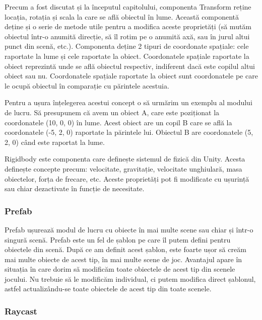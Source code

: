 \documentclass[12pt, a4paper]{article}
\begin{document}
	Precum a fost discutat și la începutul capitolului, componenta Transform reține locația, rotația și scala la care se află obiectul în lume. Această componentă deține și o serie de metode utile pentru a modifica aceste proprietăți (să mutăm obiectul într-o anumită direcție, să îl rotim pe o anumită axă, sau în jurul altui punct din scenă, etc.). Componenta deține 2 tipuri de coordonate spațiale: cele raportate la lume și cele raportate la obiect. Coordonatele spațiale raportate la obiect reprezintă unde se află obiectul respectiv, indiferent dacă este copilul altui obiect sau nu. Coordonatele spațiale raportate la obiect sunt coordonatele pe care le ocupă obiectul în comparație cu părintele acestuia.
	\newline
	
	Pentru a ușura înțelegerea acestui concept o să urmărim un exemplu al modului de lucru. Să presupunem că avem un obiect A, care este poziționat la coordonatele (10, 0, 0) în lume. Acest obiect are un copil B care se află la coordonatele (-5, 2, 0) raportate la părintele lui. Obiectul B are coordonatele (5, 2, 0) când este raportat la lume.
	\newline
	
	Rigidbody este componenta care definește sistemul de fizică din Unity. Acesta definește concepte precum: velocitate, gravitație, velocitate unghiulară, masa obiectelor, forța de frecare, etc. Aceste proprietăți pot fi modificate cu ușurință sau chiar dezactivate în funcție de necesitate.
	
	
	
	
	
	\subsubsection{Prefab}
	
	Prefab ușurează modul de lucru cu obiecte în mai multe scene sau chiar și într-o singură scenă. Prefab este un fel de șablon pe care îl putem defini pentru obiectele din scenă. După ce am definit acest șablon, este foarte ușor să creăm mai multe obiecte de acest tip, în mai multe scene de joc. Avantajul apare în situația în care dorim să modificăm toate obiectele de acest tip din scenele jocului. Nu trebuie să le modificăm individual, ci putem modifica direct șablonul, astfel actualizându-se toate obiectele de acest tip din toate scenele.
	
	
	
	
	
	\subsubsection{Raycast}
	
\end{document}
